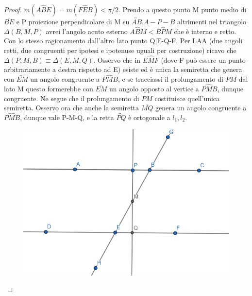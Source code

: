 \documentclass[a4paper,10pt]{article}
\theoremstyle{definition}
\theoremstyle{indentdefinition}
\theoremstyle{indentpostulate}
\theoremstyle{indenttheorem}
\theoremstyle{myremark}
\theoremstyle{indentgeneral}
\begin{document}
\begin{proof}
$m(A \hat{B}E)=m(F \hat{E} B) < \pi /2$. Prendo a questo punto M punto medio di $\overline{BE}$ e P proiezione perpendicolare di M su $\overleftrightarrow{AB}. A-P-B$ altrimenti nel triangolo $\Delta (B,M,P)$ avrei l'angolo acuto esterno $A \hat{B }M<B\hat{P}M$ che è interno e retto. Con lo stesso ragionamento dall'altro lato punto Q|E-Q-F. Per LAA (due angoli retti, due congruenti per ipotesi e ipotenuse uguali per costruzione) ricavo che $ \Delta (P,M,B) \equiv \Delta (E,M,Q)$. Osservo che in $E\hat{M}F$ (dove F può essere un punto arbitrariamente a destra rispetto ad E) esiste ed è unica la semiretta che genera con $\overleftrightarrow{EM}$ un angolo congruente a $P\hat{M}B$, e se tracciassi il prolungamento di $\overline{PM}$ dal lato M questo formerebbe con $\overline{EM}$ un angolo opposto al vertice a $P \hat{M}B$, dunque congruente. Ne segue che il prolungamento di $\overline{PM}$ costituisce quell'unica semiretta. Osservo ora che anche la semiretta $\overline{MQ}$ genera un angolo congruente a $P\hat{M}B$, dunque vale P-M-Q, e la retta $\overleftrightarrow{PQ}$ è ortogonale a $l_1,l_2$.

\begin{figure}[H]
    \centering
    \includegraphics[scale=0.5]{Parallele1.png}
\end{figure}
\end{proof}
\end{document}
